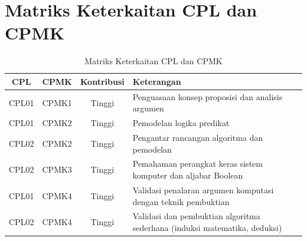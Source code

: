 \section*{Matriks Keterkaitan CPL dan CPMK}

\begin{table}[htbp]
\centering
\begin{tabular}{|c|c|c|>{\raggedright\arraybackslash}p{5.5cm}|}
  \hline
  \textbf{CPL} & \textbf{CPMK} & \textbf{Kontribusi} & \textbf{Keterangan} \\
  \hline
  CPL01 & CPMK1 & Tinggi & Penguasaan konsep proposisi dan analisis argumen \\
  \hline
  CPL01 & CPMK2 & Tinggi & Pemodelan logika predikat \\
  \hline
  CPL02 & CPMK2 & Tinggi & Pengantar rancangan algoritma dan pemodelan \\
  \hline
  CPL02 & CPMK3 & Tinggi & Pemahaman perangkat keras sistem komputer dan aljabar Boolean \\
  \hline
  CPL01 & CPMK4 & Tinggi & Validasi penalaran argumen komputasi dengan teknik pembuktian \\
  \hline
  CPL02 & CPMK4 & Tinggi & Validasi dan pembuktian algoritma sederhana (induksi matematika, deduksi) \\
  \hline
\end{tabular}
\caption{Matriks Keterkaitan CPL dan CPMK}
\end{table}

\cleardoublepage

{}
\tableofcontents
\cleardoublepage

\clearpage
{}
{}
\listoffigures
\cleardoublepage

{}
\listoftables
\cleardoublepage

{}
\lstlistoflistings
\cleardoublepage
